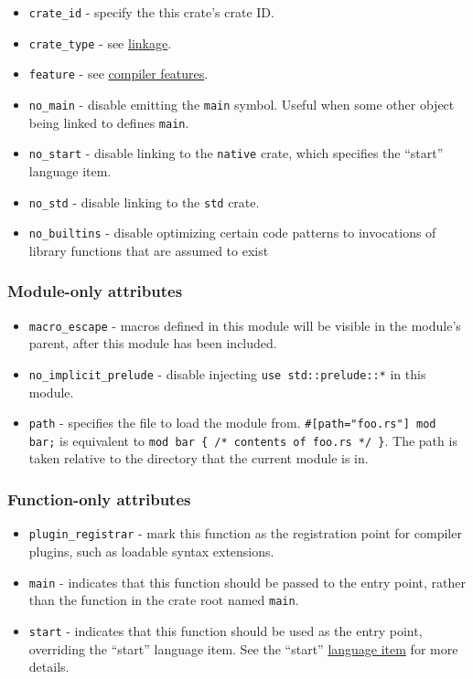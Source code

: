 \documentclass[]{article}
\begin{document}
\begin{itemize}
\itemsep1pt\parskip0pt
\item
  \texttt{crate\_id} - specify the this crate's crate ID.
\item
  \texttt{crate\_type} - see \hyperref[linkage]{linkage}.
\item
  \texttt{feature} - see \hyperref[compiler-features]{compiler
  features}.
\item
  \texttt{no\_main} - disable emitting the \texttt{main} symbol. Useful
  when some other object being linked to defines \texttt{main}.
\item
  \texttt{no\_start} - disable linking to the \texttt{native} crate,
  which specifies the ``start'' language item.
\item
  \texttt{no\_std} - disable linking to the \texttt{std} crate.
\item
  \texttt{no\_builtins} - disable optimizing certain code patterns to
  invocations of library functions that are assumed to exist
\end{itemize}

\subsubsection{Module-only attributes}\label{module-only-attributes}

\begin{itemize}
\itemsep1pt\parskip0pt
\item
  \texttt{macro\_escape} - macros defined in this module will be visible
  in the module's parent, after this module has been included.
\item
  \texttt{no\_implicit\_prelude} - disable injecting
  \texttt{use std::prelude::*} in this module.
\item
  \texttt{path} - specifies the file to load the module from.
  \texttt{\#{[}path="foo.rs"{]} mod   bar;} is equivalent to
  \texttt{mod bar \{ /* contents of foo.rs */ \}}. The path is taken
  relative to the directory that the current module is in.
\end{itemize}

\subsubsection{Function-only attributes}\label{function-only-attributes}

\begin{itemize}
\itemsep1pt\parskip0pt
\item
  \texttt{plugin\_registrar} - mark this function as the registration
  point for compiler plugins, such as loadable syntax extensions.
\item
  \texttt{main} - indicates that this function should be passed to the
  entry point, rather than the function in the crate root named
  \texttt{main}.
\item
  \texttt{start} - indicates that this function should be used as the
  entry point, overriding the ``start'' language item. See the ``start''
  \hyperref[language-items]{language item} for more details.
\end{itemize}
\end{document}
